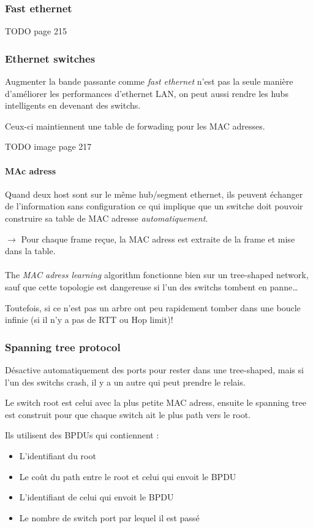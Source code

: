 \documentclass{report}
\begin{document}
\subsubsection{Fast ethernet}
TODO page 215

\subsubsection{Ethernet switches}
Augmenter la bande passante comme \textit{fast ethernet} n'est pas la seule 
manière d'améliorer les performances d'ethernet LAN, on peut aussi rendre
les hubs intelligents en devenant des switchs.

Ceux-ci maintiennent une table de forwading pour les MAC adresses.

TODO image page 217


\paragraph{MAc adress}
Quand deux host sont sur le même hub/segment ethernet, ils peuvent échanger de 
l'information sans configuration ce qui implique que un switche doit pouvoir 
construire sa table de MAC adresse \textit{automatiquement}.

$\rightarrow$ Pour chaque frame reçue, la MAC adress est extraite de la frame et mise dans la table.

\paragraph{ }
The \textit{MAC adress learning} algorithm fonctionne bien sur un tree-shaped network,
sauf que cette topologie est dangereuse si l'un des switchs tombent en panne\ldots

Toutefois, si ce n'est pas un arbre ont peu rapidement tomber dans une boucle infinie
(si il n'y a pas de RTT ou Hop limit)!

\subsubsection{Spanning tree protocol}
Désactive automatiquement des ports pour rester dans une tree-shaped, mais si l'un
des switchs crash, il y a un autre qui peut prendre le relais.

Le switch root est celui avec la plus petite MAC adress, ensuite le spanning tree est construit
pour que chaque switch ait le plus path vers le root.

Ils utilisent des BPDUs qui contiennent :
\begin{itemize}
    \item L'identifiant du root
    \item Le coût du path entre le root et celui qui envoit le BPDU
    \item L'identifiant de celui qui envoit le BPDU
    \item Le nombre de switch port par lequel il est passé
\end{itemize}
\end{document}
